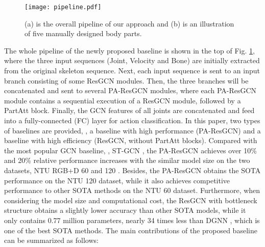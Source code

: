 \documentclass[sigconf]{acmart}
\begin{document}
\begin{figure}[t]
  \centerline{\texttt{[image: pipeline.pdf]}}
  \caption{(a) is the overall pipeline of our approach and (b) is an illustration of five manually designed body parts. \bv}\label{fig:pipeline}
  \vspace{-0.4cm}
\end{figure}

The whole pipeline of the newly proposed baseline is shown in the top of Fig. \ref{fig:pipeline}, where the three input sequences (Joint, Velocity and Bone) are initially extracted from the original skeleton sequence. Next, each input sequence is sent to an input branch consisting of some ResGCN modules. Then, the three branches will be concatenated and sent to several PA-ResGCN modules, where each PA-ResGCN module contains a sequential execution of a ResGCN module, followed by a PartAtt block. Finally, the GCN features of all joints are concatenated and feed into a fully-connected (FC) layer for action classification. In this paper, two types of baselines are provided, \ie, a baseline with high performance (PA-ResGCN) and a baseline with high efficiency (ResGCN, without PartAtt blocks). Compared with the most popular GCN baseline, \ie, ST-GCN \cite{yan2018spatial}, the PA-ResGCN achieves over 10\% and 20\% relative performance increases with the similar model size on the two datasets, NTU RGB+D 60 \cite{shahroudy2016ntu} and 120 \cite{liu2019ntu}. Besides, the PA-ResGCN obtains the SOTA performance on the NTU 120 dataset, while it also achieves competitive performance to other SOTA methods on the NTU 60 dataset. Furthermore, when considering the model size and computational cost, the ResGCN with bottleneck structure obtains a slightly lower accuracy than other SOTA models, while it only contains 0.77 million parameters, nearly 34 times less than DGNN \cite{shi2019skeleton}, which is one of the best SOTA methods. The main contributions of the proposed baseline can be summarized as follows:
\end{document}
